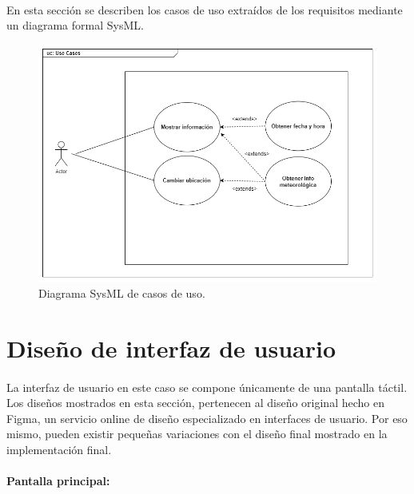 \paragraph{}En esta sección se describen los casos de uso extraídos de los requisitos
mediante un diagrama formal SysML.

\begin{figure}[H]
	\centering
	\includegraphics[width=0.9\linewidth]{figs/rpi_weather-uc}
	\caption[Diagrama SysML de casos de uso]{Diagrama SysML de casos de uso.}
	\label{fig:use_cases}
\end{figure}

\section{Diseño de interfaz de usuario}

\paragraph{}La interfaz de usuario en este caso se compone únicamente de una pantalla
táctil. Los diseños mostrados en esta sección, pertenecen al diseño original hecho en
Figma, un servicio online de diseño especializado en interfaces de usuario. Por eso mismo,
pueden existir pequeñas variaciones con el diseño final mostrado en la implementación final.

\clearpage
\paragraph{}\textbf{Pantalla principal:}


